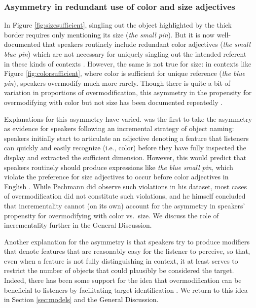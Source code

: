 \documentclass[11pt]{article}
\newcommand{\figref}[1]{Figure \ref{#1}}
\newcommand{\sectionref}[1]{Section \ref{#1}}
\begin{document}
\subsubsection{Asymmetry in redundant use of color and size adjectives}
\label{sec:asymmetry}

 In \figref{fig:sizesufficient}, singling out the object highlighted by the thick border requires only mentioning its size (\emph{the small pin}). But it is now well-documented that speakers routinely include redundant color adjectives (\emph{the small blue pin}) which are not necessary for uniquely singling out the intended referent in these kinds of contexts \cite{Pechmann1989, Belke2002, gatt2011}. However, the same is not true for size: in contexts like \figref{fig:colorsufficient}, where color is sufficient for unique reference (\emph{the blue pin}), speakers overmodify much more rarely. Though there is quite a bit of variation in proportions of overmodification, this asymmetry in the propensity for overmodifying with color but not size has been documented repeatedly \cite{Pechmann1989, sedivy2003a,gatt2011, rubiofernandez2016,Westerbeek2015,Koolen2013}. 
 

Explanations for this asymmetry have varied.  was the first to take the asymmetry as evidence for speakers following an incremental strategy of object naming: speakers initially start to articulate an adjective denoting a feature that listeners can quickly and easily recognize (i.e., color) before they have fully inspected the display and extracted the sufficient dimension. However, this would predict that speakers routinely should produce expressions like \emph{the blue small pin}, which violate the preference for size adjectives to occur before color adjectives in English \cite{bloomfield1933, sproat1991}. While Pechmann did observe such violations in his dataset, most cases of overmodification did not constitute such violations, and he himself concluded that incrementality cannot (on its own) account for the asymmetry in speakers' propensity for overmodifying with color vs.~size. We discuss the role of incrementality further in the General Discussion.


Another explanation for the asymmetry is that speakers try to produce modifiers that denote features that are reasonably easy for the listener to perceive, so that, even when a feature is not fully distinguishing in context, it at least serves to restrict the number of objects that could plausibly be considered the target. Indeed, there has been some support for the idea that overmodification can be beneficial to listeners by facilitating target identification \cite{Arts2011, rubiofernandez2016, Paraboni2007}. We return to this idea in \sectionref{sec:models} and the General Discussion.
\end{document}
